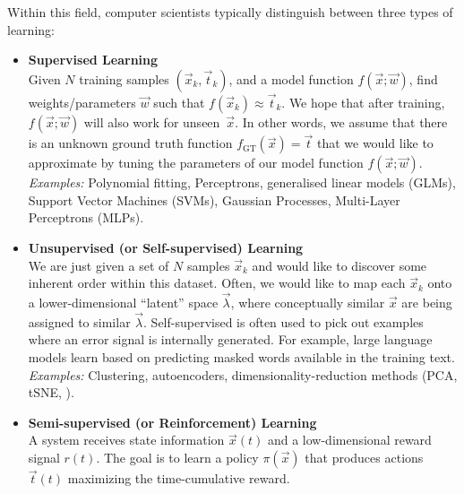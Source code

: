 \documentclass[10pt,letterpaper,oneside]{article}
\begin{document}

\newpage

Within this field, computer scientists typically distinguish between three types of learning:
\begin{itemize}
	\item \textbf{Supervised Learning}\\
	Given $N$ training samples $(\vec x_k, \vec t_k)$, and a model function $f(\vec x; \vec w)$, find weights/parameters $\vec w$ such that $f(\vec x_k) \approx \vec t_k$. We hope that after training, $f(\vec x; \vec w)$ will also work for unseen~$\vec x$. In other words, we assume that there is an unknown ground truth function $f_\mathrm{GT}(\vec x) = \vec t$ that we would like to approximate by tuning the parameters of our model function $f(\vec x; \vec w)$.\\
	\emph{Examples:} Polynomial fitting, Perceptrons, generalised linear models (GLMs), Support Vector Machines (SVMs), Gaussian Processes, Multi-Layer Perceptrons (MLPs).
	\item \textbf{Unsupervised (or Self-supervised) Learning}\\
	We are just given a set of $N$ samples $\vec x_k$ and would like to discover some inherent order within this dataset. Often, we would like to map each $\vec x_k$ onto a lower-dimensional \enquote{latent} space $\vec \lambda$, where conceptually similar $\vec x$ are being assigned to similar $\vec \lambda$. Self-supervised is often used to pick out examples where an error signal is internally generated. For example, large language models learn based on predicting masked words available in the training text.\\
	\emph{Examples:} Clustering, autoencoders, dimensionality-reduction methods (PCA, tSNE, \textellipsis).
	\item \textbf{Semi-supervised (or Reinforcement) Learning}\\
	A system receives state information $\vec x(t)$ and a low-dimensional reward signal $r(t)$. The goal is to learn a policy $\pi(\vec x)$ that produces actions $\vec t(t)$ maximizing the time-cumulative reward.
\end{itemize}
\end{document}
